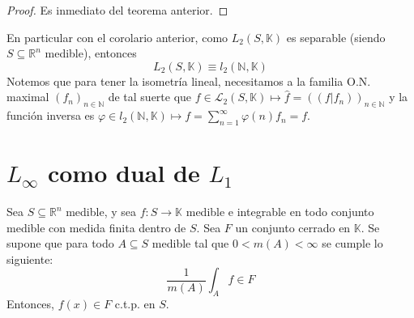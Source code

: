 \documentclass[12pt]{report}
\theoremstyle{largebreak}
\newcommand\cf[3]{\ensuremath{#1:#2\rightarrow#3}}
\newcommand\pint[2]{\ensuremath{\left(#1\big| #2\right)}}
\begin{document}
    \begin{proof}
        Es inmediato del teorema anterior.
    \end{proof}

    \begin{exa}
        En particular con el corolario anterior, como $L_2(S,\mathbb{K})$ es separable (siendo $S\subseteq\mathbb{R}^n$ medible), entonces
        \begin{equation*}
            L_2(S,\mathbb{K}) \equiv l_2(\mathbb{N},\mathbb{K})
        \end{equation*}
        Notemos que para tener la isometría lineal, necesitamos a la familia O.N. maximal $(f_n)_{ n\in\mathbb{N}}$ de tal suerte que $f\in\mathcal{L}_2(S,\mathbb{K})\mapsto \hat{f}=(\pint{f}{f_n})_{n\in\mathbb{N} }$ y la función inversa es $\varphi\in l_2(\mathbb{N},\mathbb{K})\mapsto f=\sum_{ n=1}^{\infty}\varphi(n)f_n=f$.
    \end{exa}

    \section{$L_\infty$ como dual de $L_1$}

    \begin{lema}
        Sea $S\subseteq\mathbb{R}^n$ medible, y sea $\cf{f}{S}{\mathbb{K}}$ medible e integrable en todo conjunto medible con medida finita dentro de $S$. Sea $F$ un conjunto cerrado en $\mathbb{K}$. Se supone que para todo $A\subseteq S$ medible tal que $0<m(A)<\infty$ se cumple lo siguiente:
        \begin{equation*}
            \frac{1}{m(A)}\int_A f\in F
        \end{equation*}
        Entonces, $f(x)\in F$ c.t.p. en $S$.
    \end{lema}
\end{document}
